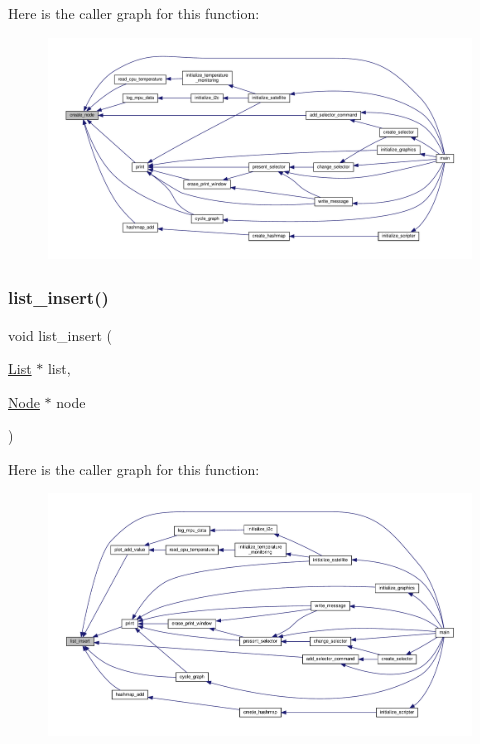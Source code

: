 Here is the caller graph for this function\+:
\nopagebreak
\begin{figure}[H]
\begin{center}
\leavevmode
\includegraphics[width=350pt]{linked-list_8c_a45dfa9366701eddf667fd95d05cc3be0_icgraph}
\end{center}
\end{figure}
\mbox{\label{linked-list_8c_a947069a28d8173531d9186a74e82fb62}} 
\subsubsection{\texorpdfstring{list\+\_\+insert()}{list\_insert()}}
{\footnotesize\ttfamily void list\+\_\+insert (\begin{DoxyParamCaption}\item[{\hyperlink{structList}{List} $\ast$}]{list,  }\item[{\hyperlink{structNode}{Node} $\ast$}]{node }\end{DoxyParamCaption})}

Here is the caller graph for this function\+:
\nopagebreak
\begin{figure}[H]
\begin{center}
\leavevmode
\includegraphics[width=350pt]{linked-list_8c_a947069a28d8173531d9186a74e82fb62_icgraph}
\end{center}
\end{figure}
\mbox{\label{linked-list_8c_ad17dd6e2d3e64d3e9665f313ffb808a1}} 

